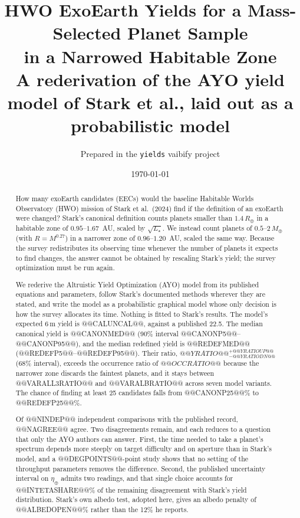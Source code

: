 \documentclass[11pt,a4paper]{article}
\title{\bfseries HWO ExoEarth Yields for a Mass-Selected Planet Sample\\
in a Narrowed Habitable Zone\\[0.3em]
\large A rederivation of the AYO yield model of Stark et al., laid out as a probabilistic model}
\author{Prepared in the \texttt{yields} vaibify project}
\date{\today}
\begin{document}
\maketitle

\begin{abstract}
\noindent
How many exoEarth candidates (EECs) would the baseline Habitable Worlds Observatory (HWO)
mission of Stark et al.\ (2024) find if the definition of an exoEarth were changed? Stark's
canonical definition counts planets smaller than $1.4\,R_\oplus$ in a habitable zone of
$0.95$--$1.67$~AU, scaled by $\sqrt{L_\star}$. We instead count planets of $0.5$--$2\,M_\oplus$
(with $R = M^{0.27}$) in a narrower zone of $0.96$--$1.20$~AU, scaled the same way. Because the
survey redistributes its observing time whenever the number of planets it expects to find changes,
the answer cannot be obtained by rescaling Stark's yield; the survey optimization must be run
again.

We rederive the Altruistic Yield Optimization (AYO) model from its published equations and
parameters, follow Stark's documented methods wherever they are stated, and write the model as a
probabilistic graphical model whose only decision is how the survey allocates its time. Nothing is
fitted to Stark's results. The model's expected 6\,m yield is @@CALUNCAL@@, against a published
22.5. The median canonical yield is @@CANONMED@@ (90\% interval @@CANONP5@@--@@CANONP95@@), and the
median redefined yield is @@REDEFMED@@ (@@REDEFP5@@--@@REDEFP95@@). Their ratio,
$@@YRATIO@@^{+@@YRATIOUP@@}_{-@@YRATIODN@@}$ (68\% interval), exceeds the occurrence ratio of $@@OCCRATIO@@$
because the narrower zone discards the faintest planets, and it stays between @@VARALL3RATIO@@
and @@VARALBRATIO@@ across seven model variants. The chance of finding at least 25 candidates falls from @@CANONP25@@\% to
@@REDEFP25@@\%.

Of @@NINDEP@@ independent comparisons with the published record, @@NAGREE@@ agree. Two
disagreements remain, and each reduces to a question that only the AYO authors can answer. First,
the time needed to take a planet's spectrum depends more steeply on target difficulty and on
aperture than in Stark's model, and a @@DEGPOINTS@@-point study shows that no setting of the
throughput parameters removes the difference. Second, the published uncertainty interval on
$\eta_\oplus$ admits two readings, and that single choice accounts for @@INTETASHARE@@\% of the
remaining disagreement with Stark's yield distribution. Stark's own albedo test, adopted here,
gives an albedo penalty of @@ALBEDOPEN@@\% rather than the 12\% he reports.
\end{abstract}
\end{document}
